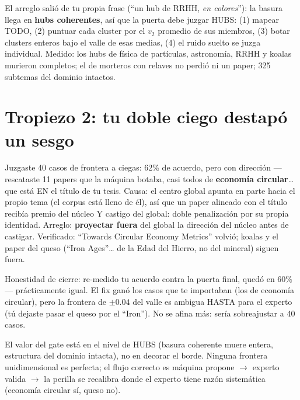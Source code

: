 \documentclass[11pt,a4paper]{article}
\begin{document}
El arreglo salió de tu propia frase (``un hub de RRHH, \emph{en colores}''): la basura
llega en \textbf{hubs coherentes}, así que la puerta debe juzgar HUBS: (1) mapear TODO,
(2) puntuar cada cluster por el $v_2$ promedio de sus miembros, (3) botar clusters
enteros bajo el valle de esas medias, (4) el ruido suelto se juzga individual. Medido:
los hubs de física de partículas, astronomía, RRHH y koalas murieron completos; el de
morteros con relaves no perdió ni un paper; 325 subtemas del dominio intactos.

\section{Tropiezo 2: tu doble ciego destapó un sesgo}

Juzgaste 40 casos de frontera a ciegas: 62\% de acuerdo, pero con dirección --- rescataste
11 papers que la máquina botaba, casi todos de \textbf{economía circular}\ldots{} que está
EN el título de tu tesis. Causa: el centro global apunta en parte hacia el propio tema
(el corpus está lleno de él), así que un paper alineado con el título recibía premio del
núcleo Y castigo del global: doble penalización por su propia identidad. Arreglo:
\textbf{proyectar fuera} del global la dirección del núcleo antes de castigar. Verificado:
``Towards Circular Economy Metrics'' volvió; koalas y el paper del queso (``Iron
Ages''\ldots{} de la Edad del Hierro, no del mineral) siguen fuera.

Honestidad de cierre: re-medido tu acuerdo contra la puerta final, quedó en 60\% ---
prácticamente igual. El fix ganó los casos que te importaban (los de economía circular),
pero la frontera de $\pm0.04$ del valle es ambigua HASTA para el experto (tú dejaste
pasar el queso por el ``Iron''). No se afina más: sería sobreajustar a 40 casos.

\begin{ojo}
El valor del gate está en el nivel de HUBS (basura coherente muere entera, estructura
del dominio intacta), no en decorar el borde. Ninguna frontera unidimensional es
perfecta; el flujo correcto es máquina propone $\to$ experto valida $\to$ la perilla se
recalibra donde el experto tiene razón sistemática (economía circular sí, queso no).
\end{ojo}
\end{document}
